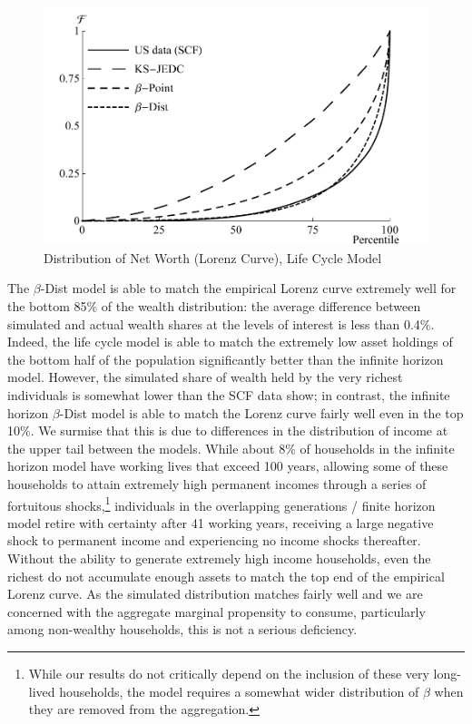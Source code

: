 \documentclass{econtex}\usepackage[pdftex]{graphicx}\usepackage{epstopdf} \usepackage[pdftex]{hyperref}
\newcommand{\Discount}{\ensuremath{\beta}}
\begin{document}
\begin{figure}
\caption{Distribution of Net Worth (Lorenz Curve), Life Cycle Model}
\label{fig:LorenzLifeCycle}
\begin{center}
\includegraphics[scale=0.75]{../Figures/LifeCycleLorenzPlot}
\end{center}
\end{figure}

The \Discount-Dist model is able to match the empirical Lorenz curve extremely well for the bottom 85\% of the wealth distribution: the average difference between simulated and actual wealth shares at the levels of interest is less than 0.4\%.  Indeed, the life cycle model is able to match the extremely low asset holdings of the bottom half of the population significantly better than the infinite horizon model.  However, the simulated share of wealth held by the very richest individuals is somewhat lower than the SCF data show; in contrast, the infinite horizon \Discount-Dist model is able to match the Lorenz curve fairly well even in the top 10\%.  We surmise that this is due to differences in the distribution of income at the upper tail between the models.  While about 8\% of households in the infinite horizon model have working lives that exceed 100 years, allowing some of these households to attain extremely high permanent incomes through a series of fortuitous shocks,\footnote{While our results do not critically depend on the inclusion of these very long-lived households, the model requires a somewhat wider distribution of $\Discount$ when they are removed from the aggregation.} individuals in the overlapping generations / finite horizon model retire with certainty after 41 working years, receiving a large negative shock to permanent income and experiencing no income shocks thereafter.  Without the ability to generate extremely high income households, even the richest do not accumulate enough assets to match the top end of the empirical Lorenz curve.  As the simulated distribution matches fairly well and we are concerned with the aggregate marginal propensity to consume, particularly among non-wealthy households, this is not a serious deficiency.
\end{document}
